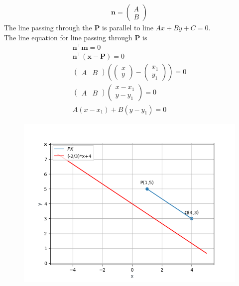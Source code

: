 \documentclass[10pt]{article}
\providecommand{\brak}[1]{\ensuremath{\left(#1\right)}}
\newcommand{\myvec}[1]{\ensuremath{\begin{pmatrix}#1\end{pmatrix}}}
\let\vec\mathbf{}
\begin{document}
\begin{enumerate}
\begin{align}
\vec{n}=\myvec{A\\B}
\end{align}
The line passing through the $\vec{P}$ is parallel to line $Ax+By+C=0$.\\
The line equation for line passing through $\vec{P}$ is
\begin{align}
\vec{n}^{\top}\vec{m}=0\\
\vec{n}^\top\brak{\vec{x}-\vec{P}}=0\\
\myvec{A&B}\brak{\myvec{x\\y}-\myvec{x_1\\y_1}}=0\\
\myvec{A&B}\myvec{x-x_1\\y-y_1}=0\\
A(x-x_1)+B(y-y_1)=0
\end{align}
\begin{figure}[!h]
	\begin{center}
		\includegraphics[width=\columnwidth]{./figs/fig.png}
	\end{center}
\caption{}
\end{figure}

\end{enumerate}
\end{document}
